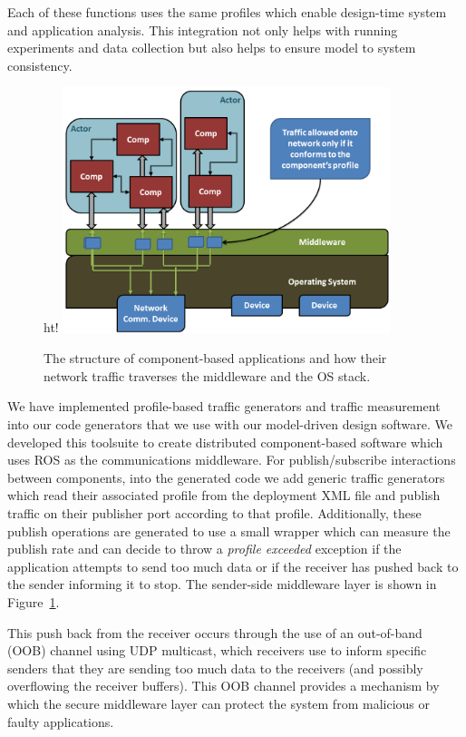 Each of these functions uses the same profiles which enable
design-time system and application analysis.  This integration not
only helps with running experiments and data collection but also helps
to ensure model to system consistency.
  
\begin{figure}{ht!}
  \centering
  \includegraphics[width=0.85\textwidth]{../doc/src/images/results/app_layers.png}
  \caption{The structure of component-based applications and how their network
   traffic traverses the middleware and the OS stack.}
  \label{fig:sender}
\end{figure}

We have implemented profile-based traffic generators and traffic
measurement into our code generators that we use with our model-driven
design software.  We developed this toolsuite to create distributed
component-based software which uses ROS as the communications
middleware.  For publish/subscribe interactions between components,
into the generated code we add generic traffic generators which read
their associated profile from the deployment XML file and publish
traffic on their publisher port according to that profile.
Additionally, these publish operations are generated to use a small
wrapper which can measure the publish rate and can decide to throw a
\emph{profile exceeded} exception if the application attempts to send
too much data or if the receiver has pushed back to the sender
informing it to stop.  The sender-side middleware layer is shown in
Figure~\ref{fig:sender}.

This push back from the receiver occurs through the use of an
out-of-band (OOB) channel using UDP multicast, which receivers use to
inform specific senders that they are sending too much data to the
receivers (and possibly overflowing the receiver buffers).  This OOB
channel provides a mechanism by which the secure middleware layer can
protect the system from malicious or faulty applications.

